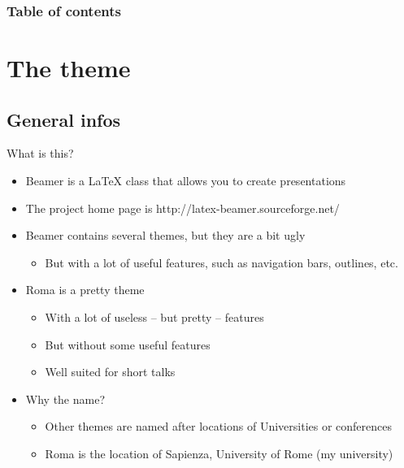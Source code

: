 
\begin{frame}[t,plain]
\titlepage
\end{frame}

\begin{frame}
\frametitle{Table of contents}
\tableofcontents
\end{frame}


\section{The theme}
\subsection{General infos}
\begin{frame}[t]{What is this?}
\begin{itemize}
\item Beamer is a \LaTeX{} class that allows you to create presentations
\item The project home page is http://latex-beamer.sourceforge.net/
\item Beamer contains several themes, but they are a bit ugly
  \begin{itemize}
  \item But with a lot of useful features, such as navigation bars, outlines,
    etc.
  \end{itemize}
\item Roma is a pretty theme
  \begin{itemize}
  \item With a lot of useless -- \alert{but pretty} -- features
  \item But without some useful features
  \item Well suited for short talks
  \end{itemize}
\item Why the name?
  \begin{itemize}
  \item Other themes are named after locations of Universities or conferences
  \item Roma is the location of Sapienza, University of Rome (my university)
  \end{itemize}
\end{itemize}
\end{frame}

